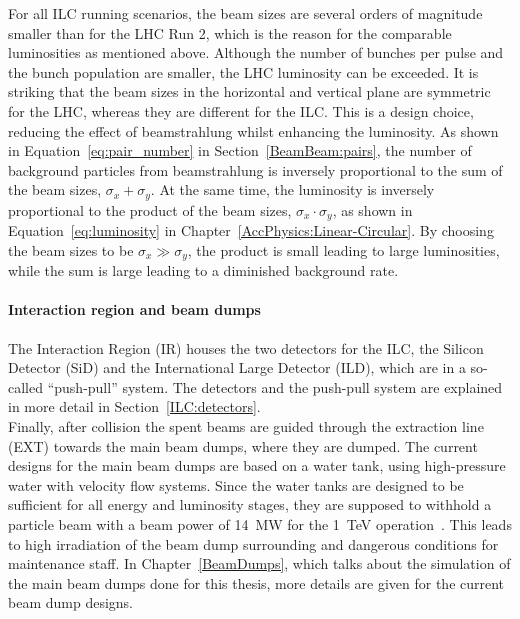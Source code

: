 For all ILC running scenarios, the beam sizes are several orders of magnitude smaller than for the LHC Run 2, which is the reason for the comparable luminosities as mentioned above.
Although the number of bunches per pulse and the bunch population are smaller, the LHC luminosity can be exceeded.
It is striking that the beam sizes in the horizontal and vertical plane are symmetric for the LHC, whereas they are different for the ILC.
This is a design choice, reducing the effect of beamstrahlung whilst enhancing the luminosity.
As shown in Equation~\ref{eq:pair_number} in Section~\ref{BeamBeam:pairs}, the number of background particles from beamstrahlung is inversely proportional to the sum of the beam sizes, $\sigma_x+\sigma_y$.
At the same time, the luminosity is inversely proportional to the product of the beam sizes, $\sigma_x\cdot\sigma_y$, as shown in Equation~\ref{eq:luminosity} in Chapter~\ref{AccPhysics:Linear-Circular}.
By choosing the beam sizes to be $\sigma_x\gg\sigma_y$, the product is small leading to large luminosities, while the sum is large leading to a diminished background rate.
\paragraph{Interaction region and beam dumps}
The Interaction Region (IR) houses the two detectors for the ILC, the Silicon Detector (SiD) and the International Large Detector (ILD), which are in a so-called ``push-pull'' system.
The detectors and the push-pull system are explained in more detail in Section~\ref{ILC:detectors}.\\
Finally, after collision the spent beams are guided through the extraction line (EXT) towards the main beam dumps, where they are dumped.
The current designs for the main beam dumps are based on a water tank, using high-pressure water with velocity flow systems.
Since the water tanks are designed to be sufficient for all energy and luminosity stages, they are supposed to withhold a particle beam with a beam power of \SI{14}{\mega\watt} for the \SI{1}{\TeV} operation~\cite[p. 18]{TDR32}.
This leads to high irradiation of the beam dump surrounding and dangerous conditions for maintenance staff.
In Chapter~\ref{BeamDumps}, which talks about the simulation of the main beam dumps done for this thesis, more details are given for the current beam dump designs.


